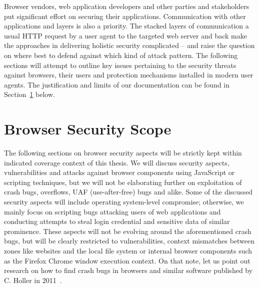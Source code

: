  Browser vendors, web application developers and other parties and stakeholders put significant effort on securing their applications. Communication with other applications and layers is also a priority. The stacked layers of communication a usual HTTP request by a user agent to the targeted web server and back make the approaches in delivering holistic security complicated -- and raise the question on where best to defend against which kind of attack pattern. 
  The following sections will attempt to outline key issues pertaining to the security threats against browsers, their users and protection mechanisms installed in modern user agents. The justification and limits of our documentation can be found in Section~\ref{subsec:2.2.bro_sec_scope} below.

  \section{Browser Security Scope}
  \label{subsec:2.2.bro_sec_scope}

  The following sections on browser security aspects will be strictly kept within indicated coverage context of this thesis. We will discuss security aspects, vulnerabilities and attacks against browser components using JavaScript or scripting techniques, but we will not be elaborating further on exploitation of crash bugs, overflows, UAF (use-after-free) bugs and alike. Some of the discussed security aspects will  include operating system-level compromise; otherwise, we mainly focus on scripting bugs attacking users of web applications and conducting attempts to steal login credential and sensitive data of similar prominence. These aspects will not be evolving around the aforementioned crash bugs, but will be clearly restricted to vulnerabilities, context mismatches between zones like websites and the local file system or internal browser components such as the Firefox Chrome window execution context. On that note, let us point out research on how to find crash bugs in browsers and similar software 
published by C. Holler in 2011~\cite{holler2011grammar}.


